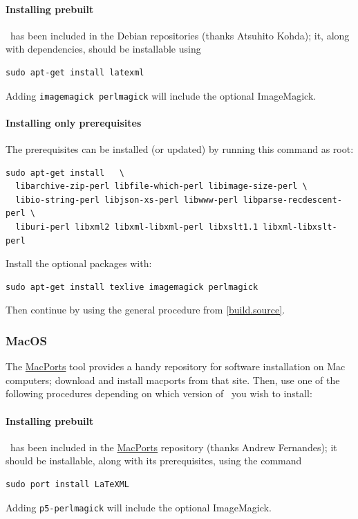 \documentclass{article}
\begin{document}
\paragraph{Installing prebuilt}
\LaTeXML\ has been included in the Debian repositories (thanks Atsuhito Kohda);
it, along with dependencies, should be installable using
\begin{lstlisting}[style=shell]
sudo apt-get install latexml
\end{lstlisting}
Adding \texttt{imagemagick perlmagick} will include the optional ImageMagick.

\paragraph{Installing only prerequisites}
The prerequisites can be installed (or updated) by running this command as root: 
\begin{lstlisting}[style=shell]
sudo apt-get install   \
  libarchive-zip-perl libfile-which-perl libimage-size-perl \
  libio-string-perl libjson-xs-perl libwww-perl libparse-recdescent-perl \
  liburi-perl libxml2 libxml-libxml-perl libxslt1.1 libxml-libxslt-perl
\end{lstlisting}
Install the optional packages with:
\begin{lstlisting}[style=shell]
sudo apt-get install texlive imagemagick perlmagick 
\end{lstlisting}
Then continue by using the general procedure from \ref{build.source}.


\subsubsection{MacOS}\label{install.macos}\index{macintosh}
The \href{http://www.macports.org}{MacPorts} tool provides a handy
repository for software installation on Mac computers;
download and install macports from that site.
Then, use one of the following procedures depending on which version
of \LaTeXML\ you wish to install:

\paragraph{Installing prebuilt}
\LaTeXML\ has been included in the \href{http://www.macports.org}{MacPorts}
repository (thanks Andrew Fernandes);
it should be installable, along with its prerequisites, using the command
\begin{lstlisting}[style=shell]
sudo port install LaTeXML
\end{lstlisting}
Adding \texttt{p5-perlmagick} will include the optional ImageMagick.
\end{document}
